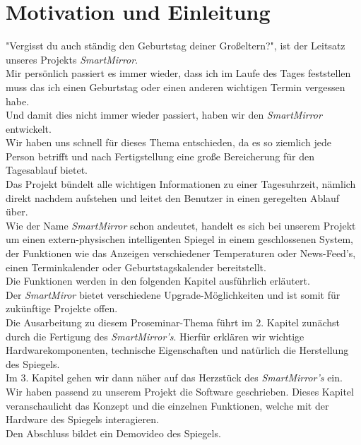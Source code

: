 \chapter{Motivation und Einleitung}
"Vergisst du auch ständig den Geburtstag deiner Großeltern?", ist der Leitsatz unseres Projekts \textit{SmartMirror}. \\

Mir persönlich passiert es immer wieder, dass ich im Laufe des Tages feststellen muss das ich einen Geburtstag oder einen anderen wichtigen Termin vergessen habe. \\
Und damit dies nicht immer wieder passiert, haben wir den \textit{SmartMirror} entwickelt. \\

Wir haben uns schnell für dieses Thema entschieden, da es so ziemlich jede Person betrifft und nach Fertigstellung eine große Bereicherung für den Tagesablauf bietet. \\
Das Projekt bündelt alle wichtigen Informationen zu einer Tagesuhrzeit, nämlich direkt nachdem aufstehen und leitet den Benutzer in einen geregelten Ablauf über. \\

Wie der Name \textit{SmartMirror} schon andeutet, handelt es sich bei unserem Projekt um einen extern-physischen intelligenten Spiegel in einem geschlossenen System, der Funktionen wie das Anzeigen verschiedener Temperaturen oder News-Feed's, einen Terminkalender oder Geburtstagskalender bereitstellt. \\
Die Funktionen werden in den folgenden Kapitel ausführlich erläutert. \\
Der \textit{SmartMiror} bietet verschiedene Upgrade-Möglichkeiten und ist somit für zukünftige Projekte offen. \\

Die Ausarbeitung zu diesem Proseminar-Thema führt im 2. Kapitel zunächst durch die Fertigung des \textit{SmartMirror's}. Hierfür erklären wir wichtige Hardwarekomponenten, technische Eigenschaften und natürlich die Herstellung des Spiegels. \\

Im 3. Kapitel gehen wir dann näher auf das Herzstück des \textit{SmartMirror's} ein. Wir haben passend zu unserem Projekt die Software geschrieben. Dieses Kapitel veranschaulicht das Konzept und die einzelnen Funktionen, welche mit der Hardware des Spiegels interagieren. \\
Den Abschluss bildet ein Demovideo des Spiegels.



